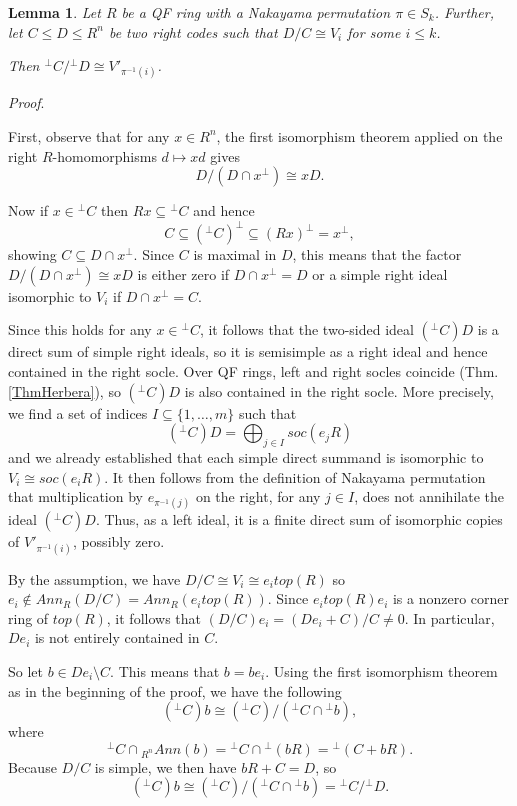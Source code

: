 \documentclass{article}
\theoremstyle{plain}
\newtheorem{Lemma}[veta]{Lemma}
\theoremstyle{plain}
\theoremstyle{remark}
\theoremstyle{plain}
\newenvironment{dukaz}{
  \par\medskip \noindent
  \textit{Proof}.
}{

\rightline{$\qedsymbol$}
}
\begin{document}
\begin{Lemma}\label{LemmaNakPerm}
Let $R$ be a  QF ring with a Nakayama permutation $\pi\in S_k$. Further, let $C\leq D\leq R^n$ be two right codes such that $D/C\cong V_i$ for some $i\leq k$.

    Then ${}^\perp C/{}^\perp D \cong V'_{\pi^{-1}(i)}$.
\end{Lemma}
\begin{dukaz}
    First, observe that for any $x\in R^n$, the first isomorphism theorem applied on the right $R$-homomorphisms $d\mapsto xd$ gives 
    \[         D/(D\cap x^\perp)\cong xD.\]
      
   Now if $x\in {}^\perp C$ then $Rx\subseteq {}^\perp C$ and hence \[C\subseteq ({}^\perp C)^\perp\subseteq (Rx)^\perp=x^\perp,\]
   showing $C\subseteq D\cap x^\perp$. Since $C$ is maximal in $D$, this means that the factor $D/(D\cap x^\perp)\cong xD$ is either zero if $D\cap x^\perp=D$ or a simple right ideal isomorphic to $V_i$ if $D\cap x^\perp=C$.
   
   Since this holds for any $x\in {}^\perp C$, it follows that the two-sided ideal $({}^\perp C)D$ is a direct sum of simple right ideals, so it is semisimple as a right ideal and hence contained in the right socle. Over QF rings, left and right socles coincide (Thm. \ref{ThmHerbera}), so $({}^\perp C)D$ is also contained in the right socle.  More precisely, we find a set of indices $I\subseteq \{1, \dots, m\}$ such that
   \[({}^\perp C)D= \bigoplus_{j\in I} soc(e_jR)\]
and we already established that each simple direct summand is isomorphic to $V_i\cong soc(e_iR)$. It then follows from the definition of Nakayama permutation that multiplication by $e_{\pi^{-1}(j)}$ on the right, for any $j\in I$, does not annihilate the ideal $({}^\perp C)D$.  Thus, as a left ideal, it is a finite direct sum of isomorphic copies of $V'_{\pi^{-1}(i)}$, possibly zero.

\medskip 
   
   By the assumption,  we have $D/C\cong V_i\cong e_itop(R)$ so $e_i\notin Ann_R(D/C)=Ann_R(e_itop(R))$. Since $e_itop(R)e_i$ is a nonzero corner ring of $top(R)$, it follows that $(D/C)e_i=(De_i+C)/C\neq 0$.    
   In particular, $De_i$ is not entirely contained in $C$. 
   
   So let $b\in De_i\setminus C$. This means that $b=be_i$. Using the first isomorphism theorem as in the beginning of the proof, we have the following
   \[({}^\perp C)b\cong ({}^\perp C)/({}^\perp C\cap {}^\perp b), \]
   where \[{}^\perp C\cap {}_{R^n}Ann(b)={}^\perp C\cap {}^\perp(bR)={}^\perp(C+bR).\] 
 Because  $D/C$ is simple, we then have $bR+C=D$, so 
   \[({}^\perp C)b\cong ({}^\perp C)/({}^\perp C\cap {}^\perp b)= {}^\perp C/{}^\perp D.\]


\end{dukaz}
\end{document}
